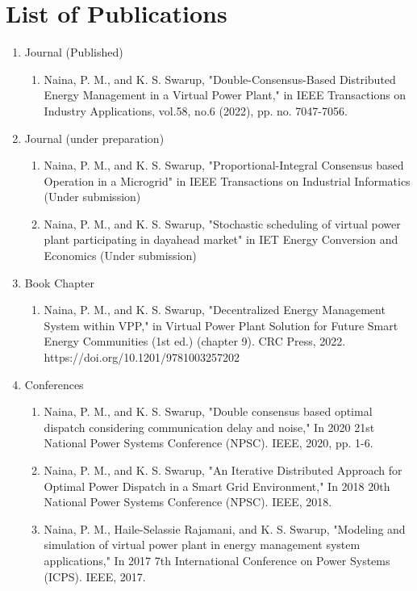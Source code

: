 \documentclass
    [phd,synopsis]
    {iitmdissertation}
\begin{document}
\newpage

\section{List of Publications}
\begin{enumerate}
    \item{Journal (Published)}
    \begin{enumerate}
        \item Naina, P. M., and K. S. Swarup, "Double-Consensus-Based Distributed Energy Management in a Virtual Power Plant," in IEEE Transactions on Industry Applications, vol.58, no.6 (2022), pp. no. 7047-7056. \par
    \end{enumerate}    
    \item{Journal (under preparation)}
    \begin{enumerate}
        \item Naina, P. M., and K. S. Swarup, "Proportional-Integral Consensus based Operation in a Microgrid" in IEEE Transactions on Industrial Informatics (Under submission)
        \item Naina, P. M., and K. S. Swarup, "Stochastic scheduling of virtual power plant participating in dayahead market" in IET Energy Conversion and Economics (Under submission)
    \end{enumerate}
    \item{Book Chapter}
    \begin{enumerate}
        \item Naina, P. M., and K. S. Swarup, "Decentralized Energy Management System within VPP," in Virtual Power Plant Solution for Future Smart Energy Communities (1st ed.) (chapter 9). CRC Press, 2022. https://doi.org/10.1201/9781003257202
    \end{enumerate} \par
    \item{Conferences}
    \begin{enumerate}
        \item Naina, P. M., and K. S. Swarup, "Double consensus based optimal dispatch considering communication delay and noise," In 2020 21st National Power Systems Conference (NPSC). IEEE, 2020, pp. 1-6. 
        \item Naina, P. M., and K. S. Swarup, "An Iterative Distributed Approach for Optimal Power Dispatch in a Smart Grid Environment," In 2018 20th National Power Systems Conference (NPSC). IEEE, 2018. 
        \item Naina, P. M., Haile-Selassie Rajamani, and K. S. Swarup, "Modeling and simulation of virtual power plant in energy management system applications," In 2017 7th International Conference on Power Systems (ICPS). IEEE, 2017.\par
    \end{enumerate}
\end{enumerate}
        

\end{document}
